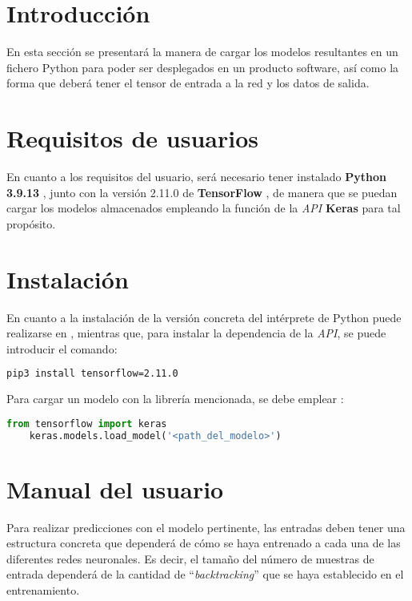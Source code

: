 
\section{Introducción}
En esta sección se presentará la manera de cargar los modelos resultantes en un fichero Python para poder ser desplegados en un producto software, 
así como la forma que deberá tener el tensor de entrada a la red y los datos de salida.

\section{Requisitos de usuarios}
En cuanto a los requisitos del usuario, será necesario tener instalado \textbf{Python 3.9.13} \cite{misc:python2023}, junto con la versión 2.11.0 de \textbf{TensorFlow} \cite{misc:tensorflow2023},
de manera que se puedan cargar los modelos almacenados empleando la función de la \textit{API} \textbf{Keras} para tal propósito.

\section{Instalación}
En cuanto a la instalación de la versión concreta del intérprete de Python puede realizarse en \cite{misc:python2023}, mientras que, para instalar la dependencia de la \textit{API},
se puede introducir el comando:
\begin{lstlisting}[language=Bash]
    pip3 install tensorflow=2.11.0
\end{lstlisting}

Para cargar un modelo con la librería mencionada, se debe emplear \cite{misc:tensorflow_save2023}:
\begin{lstlisting}[language=Python]
    from tensorflow import keras
    keras.models.load_model('<path_del_modelo>')
\end{lstlisting}

\section{Manual del usuario}
Para realizar predicciones con el modelo pertinente, las entradas deben tener una estructura concreta que dependerá de cómo se haya entrenado a cada una de las diferentes redes neuronales.
Es decir, el tamaño del número de muestras de entrada dependerá de la cantidad de ``\textit{backtracking}'' que se haya establecido en el entrenamiento.

